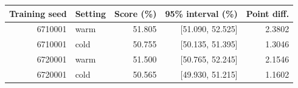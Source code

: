\begin{tabular}{rlrrr}
\toprule
Training seed & Setting & Score (\%) & 95\% interval (\%) & Point diff. \\
\midrule
6710001 & warm & 51.805 & [51.090, 52.525] & 2.3802 \\
6710001 & cold & 50.755 & [50.135, 51.395] & 1.3046 \\
6720001 & warm & 51.500 & [50.765, 52.245] & 2.1546 \\
6720001 & cold & 50.565 & [49.930, 51.215] & 1.1602 \\
\bottomrule
\end{tabular}

